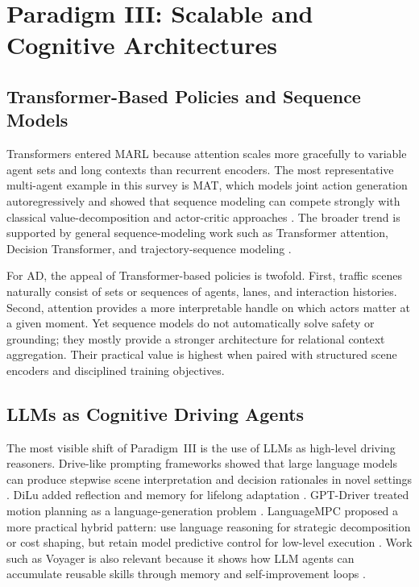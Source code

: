 \documentclass[12pt, a4paper]{article}
\begin{document}
\section{Paradigm III: Scalable and Cognitive Architectures}
\label{sec:paradigm3}

\subsection{Transformer-Based Policies and Sequence Models}

Transformers entered MARL because attention scales more gracefully to variable
agent sets and long contexts than recurrent encoders. The most representative
multi-agent example in this survey is MAT, which models joint action generation
autoregressively and showed that sequence modeling can compete strongly with
classical value-decomposition and actor-critic approaches \cite{wen2022multi}. The
broader trend is supported by general sequence-modeling work such as Transformer
attention, Decision Transformer, and trajectory-sequence modeling
\cite{vaswani2017attention,chen2021decision,janner2021offline,parisotto2020stabilizing}.

For AD, the appeal of Transformer-based policies is twofold. First, traffic
scenes naturally consist of sets or sequences of agents, lanes, and interaction
histories. Second, attention provides a more interpretable handle on which actors
matter at a given moment. Yet sequence models do not automatically solve safety
or grounding; they mostly provide a stronger architecture for relational context
aggregation. Their practical value is highest when paired with structured scene
encoders and disciplined training objectives.

\subsection{LLMs as Cognitive Driving Agents}

The most visible shift of Paradigm~III is the use of LLMs as high-level driving
reasoners. Drive-like prompting frameworks showed that large language models can
produce stepwise scene interpretation and decision rationales in novel settings
\cite{fu2023drive,brown2020language}. DiLu added reflection and memory for
lifelong adaptation \cite{wen2023dilu}. GPT-Driver treated motion planning as a
language-generation problem \cite{mao2023gpt}. LanguageMPC proposed a more
practical hybrid pattern: use language reasoning for strategic decomposition or
cost shaping, but retain model predictive control for low-level execution
\cite{sha2023languagempc}. Work such as Voyager is also relevant because it shows
how LLM agents can accumulate reusable skills through memory and self-improvement
loops \cite{wang2023voyager}.
\end{document}
